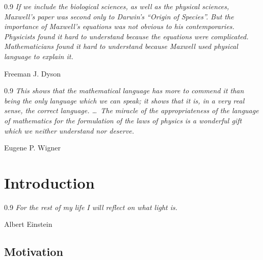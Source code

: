 \documentclass[1p,sort&compress]{elsarticle}
\numberwithin{equation}{section}
\newcommand\epigraph[3]{
\vspace{1em}\hfill{}\begin{minipage}{#1}{\begin{spacing}{0.9}
\small\noindent\textit{#2}\end{spacing}
\vspace{1em}
\hfill{}{#3}}\vspace{2em}
\end{minipage}}
\begin{document}

\tableofcontents
\listoftables
\listoffigures


\vspace{1cm}

\epigraph{4.5in}{If we include the biological sciences, as well as the physical sciences, Maxwell's paper was second only to Darwin's ``Origin of Species''.  But the importance of Maxwell's equations was not obvious to his contemporaries.  Physicists found it hard to understand because the equations were complicated.  Mathematicians found it hard to understand because Maxwell used physical language to explain it.}{Freeman J. Dyson \cite{Dyson1999}}

\epigraph{4.5in}{This shows that the mathematical language has more to commend it than being the only language which we can speak; it shows that it is, in a very real sense, the correct language. \ldots~The miracle of the appropriateness of the language of mathematics for the formulation of the laws of physics is a wonderful gift which we neither understand nor deserve.}{Eugene P. Wigner \cite{Wigner1960}}


\section{Introduction}



\epigraph{4.5in}{For the rest of my life I will reflect on what light is.}{Albert Einstein \cite{Perkowitz1999}}


\subsection{Motivation}
\end{document}
